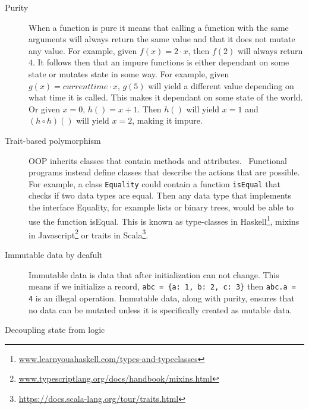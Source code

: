 \begin{description}
\item[ Purity ]

When a function is pure it means that calling a function with the same arguments
        will always return the same value and that it does not mutate any value.
        For example, given $f(x) = 2\cdot x$, then $f(2)$ will always
        return $4$. It follows then that an impure functions is either dependant
        on some state or mutates state in some way. For example, given $g(x) =
        currenttime \cdot x$, $g(5)$ will yield a different value depending on
        what time it is called. This makes it dependant on some state of the
        world. Or given $x=0$, $h()=x+1$. Then $h()$ will yield $x=1$ and $(h
        \circ h)()$ will yield $x=2$, making it impure.~\cite{wikipedia_pure}

	\item[ Trait-based polymorphism ]

		OOP inherits classes that contain methods and
attributes.~\cite{Gamma:1995:DPE:186897} Functional programs instead
define classes that describe the actions that are possible. For example, a
class \texttt{Equality} could contain a function \texttt{isEqual} that checks
if two data types are equal. Then any data type that implements the interface
Equality, for example lists or binary trees, would be able to use the function
isEqual.  This is known as type-classes in
Haskell\footnote{\url{www.learnyouahaskell.com/types-and-typeclasses}}, mixins
in Javascript\footnote{\url{www.typescriptlang.org/docs/handbook/mixins.html}}
or traits in Scala\footnote{\url{https://docs.scala-lang.org/tour/traits.html}}.

\item[ Immutable data by deafult ]

Immutable data is data that after initialization can not change. This means if
we initialize a record, \texttt{abc = \{a: 1, b: 2, c: 3\}} then \texttt{abc.a
= 4} is an illegal operation. Immutable data, along with purity, ensures that
no data can be mutated unless it is specifically created as mutable data.

\item[Decoupling state from logic]


\end{description}

